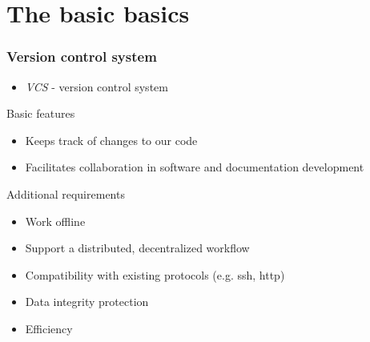 \section{The basic basics}

\begin{frame}

\frametitle{Version control system}
	
	\begin{itemize}
	\item \emph{VCS} - version control system
	\end{itemize}
	
\begin{block}{Basic features}
	\begin{itemize}
		\item Keeps track of changes to our code
		\item Facilitates collaboration in software and documentation development
	\end{itemize}
\end{block}
	
\begin{block}{Additional requirements}
	\begin{itemize}
		\item Work offline
		\item Support a distributed, decentralized workflow
		\item Compatibility with existing protocols (e.g. ssh, http)
		\item Data integrity protection
		\item Efficiency
	\end{itemize}
\end{block}

\end{frame}


